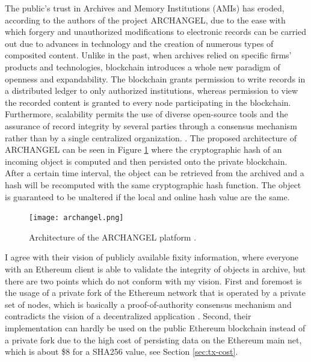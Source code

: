 \documentclass[final]{vutinfth}
\begin{document}
The public's trust in Archives and Memory Institutions (AMIs) has eroded, according to the authors of the project ARCHANGEL, due to the ease with which forgery and unauthorized modifications to electronic records can be carried out due to advances in technology and the creation of numerous types of composited content. Unlike in the past, when archives relied on specific firms' products and technologies, blockchain introduces a whole new paradigm of openness and expandability. The blockchain grants permission to write records in a distributed ledger to only authorized institutions, whereas permission to view the recorded content is granted to every node participating in the blockchain. Furthermore, scalability permits the use of diverse open-source tools and the assurance of record integrity by several parties through a consensus mechanism rather than by a single centralized organization. \cite[4]{wang2021research}.
The proposed architecture of ARCHANGEL can be seen in Figure \ref{fig:archangel} where the cryptographic hash of an incoming object is computed and then persisted onto the private blockchain. After a certain time interval, the object can be retrieved from the archived and a hash will be recomputed with the same cryptographic hash function. The object is guaranteed to be unaltered if the local and online hash value are the same.
\begin{figure}[t]
    \centering
    \texttt{[image: archangel.png]}
    \caption{Architecture of the ARCHANGEL platform \cite[2]{collomosse2018archangel}.}
    \label{fig:archangel}
\end{figure}
I agree with their vision of publicly available fixity information, where everyone with an Ethereum client is able to validate the integrity of objects in archive, but there are two points which do not conform with my vision. First and foremost is the usage of a private fork of the Ethereum network that is operated by a private set of nodes, which is basically a proof-of-authority consensus mechanism and contradicts the vision of a decentralized application \cite[3]{collomosse2018archangel}. Second, their implementation can hardly be used on the public Ethereum blockchain instead of a private fork due to the high cost of persisting data on the Ethereum main net, which is about \$8 for a SHA256 value, see Section \ref{sec:tx-cost}. 
\end{document}
